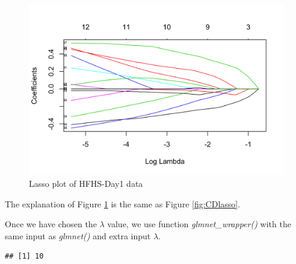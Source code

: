 \documentclass[openany]{book}
\newenvironment{Shaded}{\begin{snugshade}}{\end{snugshade}}
\newcommand{\KeywordTok}[1]{\textcolor[rgb]{0.13,0.29,0.53}{\textbf{#1}}}
\newcommand{\DataTypeTok}[1]{\textcolor[rgb]{0.13,0.29,0.53}{#1}}
\newcommand{\FloatTok}[1]{\textcolor[rgb]{0.00,0.00,0.81}{#1}}
\newcommand{\StringTok}[1]{\textcolor[rgb]{0.31,0.60,0.02}{#1}}
\newcommand{\OperatorTok}[1]{\textcolor[rgb]{0.81,0.36,0.00}{\textbf{#1}}}
\newcommand{\NormalTok}[1]{#1}
\begin{document}
\begin{figure}

{\centering \includegraphics[width=1\linewidth]{./Generated_plots/HFHSlasso-1} 

}

\caption{Lasso plot of HFHS-Day1 data}\label{fig:HFHSlasso}
\end{figure}

The explanation of Figure \ref{fig:HFHSlasso} is the same as Figure
\ref{fig:CDlasso}.

Once we have chosen the \(\lambda\) value, we use function
\emph{glmnet\_wrapper()} with the same input as \emph{glmnet()} and
extra input \textbf{\(\lambda\)}.

\begin{Shaded}
\end{Shaded}

\begin{verbatim}
## [1] 10
\end{verbatim}

\begin{Shaded}
\end{Shaded}
\end{document}
